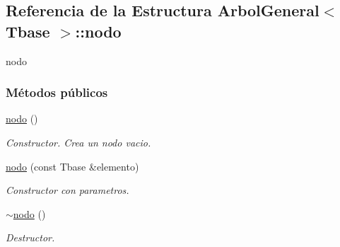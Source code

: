 \hypertarget{structArbolGeneral_1_1nodo}{}\subsection{Referencia de la Estructura Arbol\+General$<$ Tbase $>$\+:\+:nodo}
\label{structArbolGeneral_1_1nodo}


nodo  


\subsubsection*{Métodos públicos}
\begin{DoxyCompactItemize}
\item 
\hyperlink{structArbolGeneral_1_1nodo_aa217b530d586a4f7908df98083c697ff}{nodo} ()
\begin{DoxyCompactList}\small\item\em Constructor. Crea un nodo vacio. \end{DoxyCompactList}\item 
\hyperlink{structArbolGeneral_1_1nodo_a858436a6f4cf67e88dcea51708871de9}{nodo} (const Tbase \&elemento)
\begin{DoxyCompactList}\small\item\em Constructor con parametros. \end{DoxyCompactList}\item 
\hyperlink{structArbolGeneral_1_1nodo_a70407725ad94243a38097cd7477a7f10}{$\sim$nodo} ()
\begin{DoxyCompactList}\small\item\em Destructor. \end{DoxyCompactList}\end{DoxyCompactItemize}

